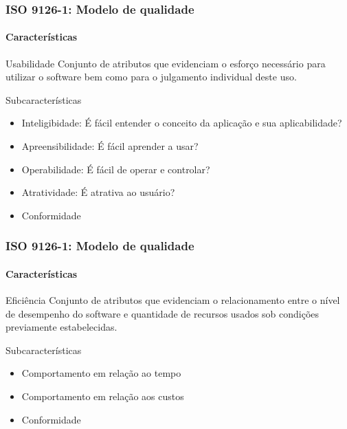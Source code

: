 \begin{frame}
	\frametitle{ISO 9126-1: Modelo de qualidade}
	\framesubtitle{Características}
	
	\begin{block:fact}{Usabilidade}
		Conjunto de atributos que evidenciam o esforço necessário para utilizar o
		software bem como para o julgamento individual deste uso.
	\end{block:fact}
	
	\begin{block:fact}{Subcaracterísticas}
		\begin{itemize}
			\item Inteligibidade: É fácil entender o conceito da aplicação e sua
			aplicabilidade?
			\item Apreensibilidade: É fácil aprender a usar?
			\item Operabilidade: É fácil de operar e controlar?
			\item Atratividade: É atrativa ao usuário?
			\item Conformidade
		\end{itemize}
	\end{block:fact}
\end{frame}


\begin{frame}
	\frametitle{ISO 9126-1: Modelo de qualidade}
	\framesubtitle{Características}
	
	\begin{block:fact}{Eficiência}
		Conjunto de atributos que evidenciam o relacionamento entre o nível de
		desempenho do software e quantidade de recursos usados sob condições
		previamente estabelecidas.
	\end{block:fact}
	
	\begin{block:fact}{Subcaracterísticas}
		\begin{itemize}
			\item Comportamento em relação ao tempo
			\item Comportamento em relação aos custos
			\item Conformidade
		\end{itemize}
	\end{block:fact}
\end{frame}


